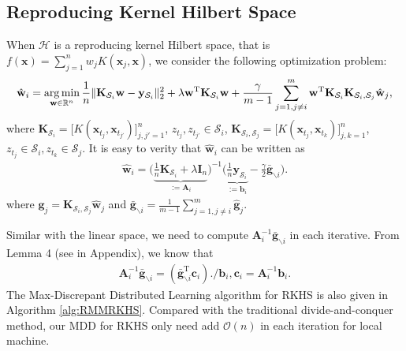 \documentclass{article}
\newcommand{\argmin}{\operatornamewithlimits{arg\,min}}
\begin{document}
\subsection{Reproducing Kernel Hilbert Space}
When $\mathcal{H}$ is a reproducing kernel Hilbert space, that is $f(\mathbf x)=\sum_{j=1}^n w_j K(\mathbf x_j,\mathbf x)$,
we consider the following optimization problem:
\begin{align}
\label{opti-RKHS}
  \hat{\mathbf w}_i=\argmin_{\mathbf w\in\mathbb{R}^n}
  \frac{1}{n}\|\mathbf K_{\mathcal{S}_i}\mathbf w-\mathbf y_{\mathcal{S}_i}\|_2^2+\lambda \mathbf w^\mathrm{T}\mathbf K_{\mathcal{S}_i}\mathbf w
  +\frac{\gamma}{m-1} \sum_{j=1,j\not=i}^{m}\mathbf w^\mathrm{T}\mathbf K_{\mathcal{S}_i}\mathbf K_{\mathcal{S}_i,\mathcal{S}_j}\hat{\mathbf w}_j,
\end{align}
where $\mathbf K_{\mathcal{S}_i}=\Big[K(\mathbf x_{t_j},\mathbf x_{t_{j'}})\Big]_{j,j'=1}^n$,
$z_{t_j},z_{t_{j'}}\in\mathcal{S}_i$,
$\mathbf K_{\mathcal{S}_i,\mathcal{S}_j}=\Big[K(\mathbf x_{t_j},\mathbf x_{t_{k}})\Big]_{j,k=1}^n$,
$z_{t_j}\in\mathcal{S}_i,z_{t_{k}}\in\mathcal{S}_j$.
It is easy to verity that
$\hat{\mathbf w}_i$ can be written as
\begin{align*}
  \hat{\mathbf w}_i=\Big(\underbrace{\frac{1}{n}\mathbf K_{\mathcal{S}_i}+\lambda \mathbf I_n}_{:=\mathbf A_i}\Big)^{-1}
  \Big(\underbrace{\frac{1}{n}\mathbf y_{\mathcal{S}_i}}_{:=\mathbf b_i}- \frac{\gamma}{2}\bar{\mathbf g}_{\backslash i}\Big).
\end{align*}
where $\mathbf g_j=\mathbf K_{\mathcal{S}_i,\mathcal{S}_j}\hat{\mathbf w}_j$ and $\bar{\mathbf g}_{\backslash i}=\frac{1}{m-1}\sum_{j=1,j\not=i}^m \hat{\mathbf g}_j$.

Similar with the linear space, we need to compute $\mathbf A_i^{-1}\bar{\mathbf g}_{\backslash i}$ in each iterative.
From Lemma 4 (see in Appendix), we know that
\begin{align*}
  \mathbf A_i^{-1}\bar{\mathbf g}_{\backslash i}=
  \left(\bar{\mathbf g}_{\backslash i}^\mathrm{T}\mathbf c_i\right)./\mathbf b_i,  \mathbf c_i=\mathbf A_i^{-1}\mathbf b_i.
\end{align*}
The Max-Discrepant Distributed Learning algorithm for RKHS is also given in Algorithm \ref{alg:RMMRKHS}.
Compared with the traditional divide-and-conquer method,
our MDD for RKHS  only need add $\mathcal{O}(n)$ in each iteration for local machine.
\end{document}
